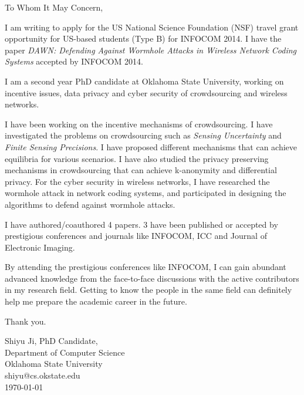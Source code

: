 \documentclass{article}
\begin{document}
\setlength{\parindent}{0cm}
\setlength{\parskip}{\baselineskip}
\pagestyle{empty}

To Whom It May Concern,

I am writing to apply for the US National Science Foundation (NSF) travel grant opportunity for US-based students (Type B) for INFOCOM 2014. I have the paper \emph{DAWN: Defending Against Wormhole Attacks in Wireless Network Coding Systems} accepted by INFOCOM 2014.

I am a second year PhD candidate at Oklahoma State University, working on incentive issues, data privacy and cyber security of crowdsourcing and wireless networks.

I have been working on the incentive mechanisms of crowdsourcing. I have investigated the problems on crowdsourcing such as \emph{Sensing Uncertainty} and \emph{Finite Sensing Precisions}. I have proposed different mechanisms that can achieve equilibria for various scenarios. I have also studied the privacy preserving mechanisms in crowdsourcing that can achieve k-anonymity and differential privacy. For the cyber security in wireless networks, I have researched the wormhole attack in network coding systems, and participated in designing the algorithms to defend against wormhole attacks.

I have authored/coauthored 4 papers. 3 have been published or accepted by prestigious conferences and journals like INFOCOM, ICC and Journal of Electronic Imaging.

By attending the prestigious conferences like INFOCOM, I can gain abundant advanced knowledge from the face-to-face discussions with the active contributors in my research field. Getting to know the people in the same field can definitely help me prepare the academic career in the future.

Thank you.

Shiyu Ji, PhD Candidate,\\
Department of Computer Science\\
Oklahoma State University\\
shiyu@cs.okstate.edu\\
\today{}
\end{document}
